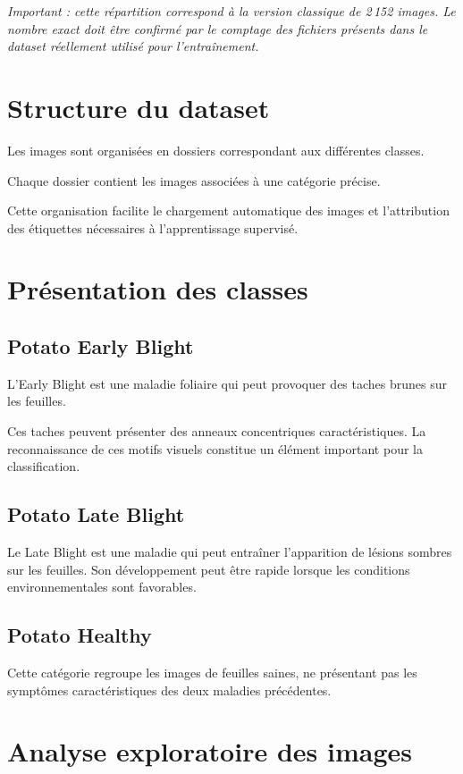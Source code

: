 \documentclass[12pt,a4paper,oneside]{report}
\begin{document}
\textit{Important : cette répartition correspond à la
version classique de 2\,152 images. Le nombre exact doit
être confirmé par le comptage des fichiers présents
dans le dataset réellement utilisé pour l'entraînement.}

\section{Structure du dataset}

Les images sont organisées en dossiers correspondant
aux différentes classes.

Chaque dossier contient les images associées à une
catégorie précise.

Cette organisation facilite le chargement automatique
des images et l'attribution des étiquettes nécessaires
à l'apprentissage supervisé.

\section{Présentation des classes}

\subsection{Potato Early Blight}

L'Early Blight est une maladie foliaire qui peut provoquer
des taches brunes sur les feuilles.

Ces taches peuvent présenter des anneaux concentriques
caractéristiques. La reconnaissance de ces motifs
visuels constitue un élément important pour la classification.

\subsection{Potato Late Blight}

Le Late Blight est une maladie qui peut entraîner
l'apparition de lésions sombres sur les feuilles.
Son développement peut être rapide lorsque les conditions
environnementales sont favorables.

\subsection{Potato Healthy}

Cette catégorie regroupe les images de feuilles saines,
ne présentant pas les symptômes caractéristiques
des deux maladies précédentes.

\section{Analyse exploratoire des images}
\end{document}

